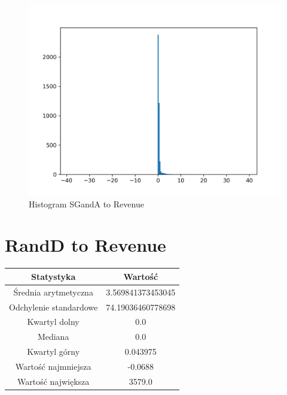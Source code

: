 \documentclass{article}
\begin{document}
\begin{figure}[h!]
    \includegraphics[width=\linewidth]{variables/SG_A to Revenue.png}
    \caption{Histogram SGandA to Revenue }
\end{figure}\section{ RandD to Revenue }

\begin{center}
    \begin{tabular}{|c | c|} 
    \hline
    Statystyka & Wartość \\
    \hline\hline
    Średnia arytmetyczna & 3.569841373453045 \\ 
    \hline
    Odchylenie standardowe & 74.19036460778698 \\
    \hline
    Kwartyl dolny & 0.0 \\
    \hline
    Mediana & 0.0 \\
    \hline
    Kwartyl górny & 0.043975 \\
    \hline
    Wartość najmniejsza & -0.0688 \\
    \hline
    Wartość największa & 3579.0 \\
    \hline
   \end{tabular}
\end{center}
\end{document}
